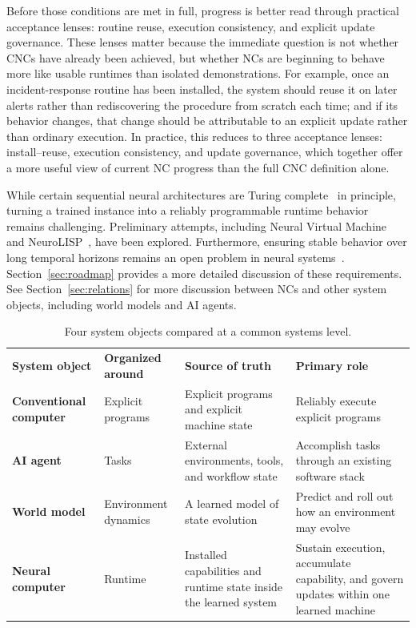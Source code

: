 Before those conditions are met in full, progress is better read through practical acceptance lenses: routine reuse, execution consistency, and explicit update governance.
These lenses matter because the immediate question is not whether CNCs have already been achieved, but whether NCs are beginning to behave more like usable runtimes than isolated demonstrations.
For example, once an incident-response routine has been installed, the system should reuse it on later alerts rather than rediscovering the procedure from scratch each time; and if its behavior changes, that change should be attributable to an explicit update rather than ordinary execution.
In practice, this reduces to three acceptance lenses: install--reuse, execution consistency, and update governance, which together offer a more useful view of current NC progress than the full CNC definition alone.

While certain sequential neural architectures are Turing complete~\citep{siegelmann1992computational,perez2021attention} in principle, turning a trained instance into a reliably programmable runtime behavior remains challenging.
Preliminary attempts, including Neural Virtual Machine~\citep{katz2019programmable} and NeuroLISP~\citep{davis2022neurolisp}, have been explored.
Furthermore, ensuring stable behavior over long temporal horizons remains an open problem in neural systems~\citep{kirkpatrick2017overcoming,calanzonelogically}. 
Section~\ref{sec:roadmap} provides a more detailed discussion of these requirements. 
See Section~\ref{sec:relations} for more discussion between NCs and other system objects, including world models and AI agents.

\begin{table}[h]
  \centering
  \small
  \caption{Four system objects compared at a common systems level.}
  \label{tab:system-objects}
  \setlength{\tabcolsep}{5pt}
  \renewcommand{\arraystretch}{1.08}
  \begin{tabularx}{\linewidth}{l X X X}
    \toprule
    \rowcolor{tablewarmhead}
    \textbf{System object} & \textbf{Organized around} & \textbf{Source of truth} & \textbf{Primary role} \\
    \textbf{Conventional computer} & Explicit programs & Explicit programs and explicit machine state & Reliably execute explicit programs \\
    \textbf{AI agent} & Tasks & External environments, tools, and workflow state & Accomplish tasks through an existing software stack \\
    \textbf{World model} & Environment dynamics & A learned model of state evolution & Predict and roll out how an environment may evolve \\
    \textbf{Neural computer} & Runtime & Installed capabilities and runtime state inside the learned system & Sustain execution, accumulate capability, and govern updates within one learned machine \\
    \bottomrule
  \end{tabularx}
\end{table}

